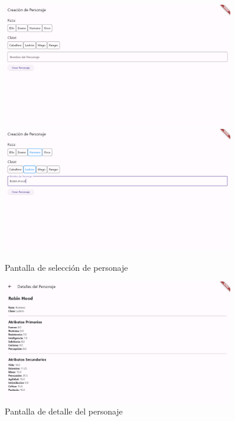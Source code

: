 \documentclass{article}
\begin{document}
\begin{figure}[h]
    \centering
    \vspace{5pt}
    \includegraphics[width=0.9\textwidth]{Ejecucion_1.png}
    \includegraphics[width=0.9\textwidth]{Ejecucion_2.png}
    \caption{Pantalla de selección de personaje}
    \label{fig:ejecucion_1}
\end{figure}

\begin{figure}[h]
    \centering
    \vspace{5pt}
    \includegraphics[width=0.9\textwidth]{Ejecucion_3.png}
    \caption{Pantalla de detalle del personaje}
    \label{fig:ejecucion_2}
\end{figure}
\end{document}
